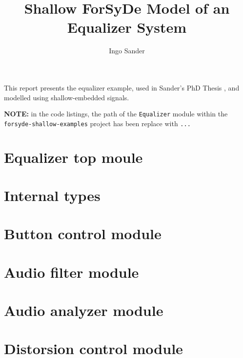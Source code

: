 \documentclass{article}
\title{Shallow ForSyDe Model of an Equalizer System}
\author{Ingo Sander}
\begin{document}
\maketitle

This report presents the equalizer example, used in Sander's PhD Thesis \cite{San03}, and modelled using shallow-embedded signals. 

\begin{framed}
  \textbf{NOTE:} in the code listings, the path of the \texttt{Equalizer} module within the \texttt{forsyde-shallow-examples} project has been replace with \texttt{...}
\end{framed}


\section{Equalizer top moule}
\label{sec:equalizer-top-moule}


\section{Internal types}
\label{sec:internal-types}


\section{Button control module}
\label{sec:butt-contr-module}


\section{Audio filter module}
\label{sec:audio-filter-module}


\section{Audio analyzer module}
\label{sec:audio-analyz-module}


\section{Distorsion control module}
\label{sec:dist-contr-module}




\printbibliography
\end{document}

